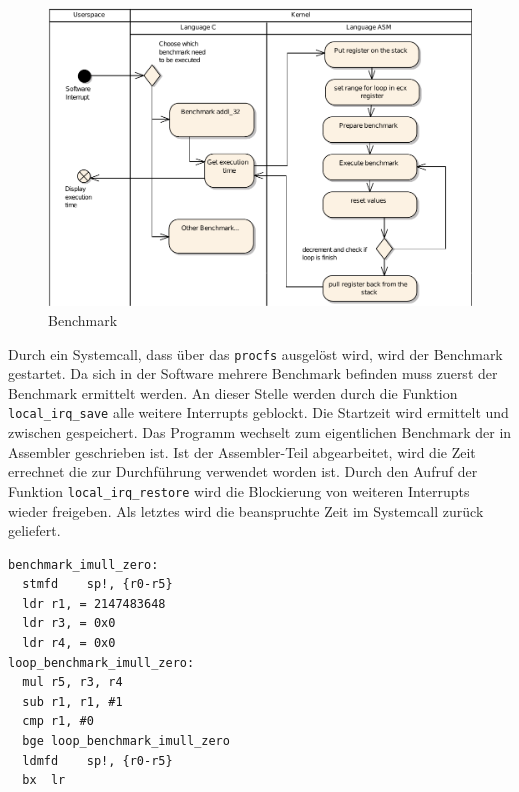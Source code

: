 \begin{figure}[H]
\centering
\includegraphics[width=1.0\textwidth]{images/benchmark_ea.pdf}
\caption{Benchmark}
\label{fig:Benchmark}
\end{figure}


Durch ein Systemcall, dass über das \texttt{procfs} ausgelöst wird, wird der Benchmark gestartet. Da sich in der Software mehrere Benchmark befinden muss zuerst der Benchmark ermittelt werden. An dieser Stelle werden durch die Funktion \texttt{local\_irq\_save} alle weitere Interrupts geblockt. Die Startzeit wird ermittelt und zwischen gespeichert. Das Programm wechselt zum eigentlichen Benchmark der in Assembler geschrieben ist. Ist der Assembler-Teil abgearbeitet, wird die Zeit errechnet die zur Durchführung verwendet worden ist. Durch den Aufruf der Funktion \texttt{local\_irq\_restore} wird die Blockierung von weiteren Interrupts wieder freigeben. Als letztes wird die beanspruchte Zeit im Systemcall zurück geliefert.

\lstset{language=[x64]Assembler}
\begin{lstlisting}[label={list:asm_benchmark},caption={Benchmark in Assembler}]
benchmark_imull_zero:
  stmfd    sp!, {r0-r5}
  ldr r1, = 2147483648
  ldr r3, = 0x0
  ldr r4, = 0x0
loop_benchmark_imull_zero:
  mul r5, r3, r4
  sub r1, r1, #1
  cmp r1, #0
  bge loop_benchmark_imull_zero
  ldmfd    sp!, {r0-r5}
  bx  lr
\end{lstlisting}

